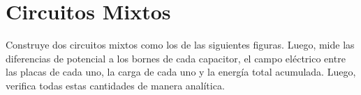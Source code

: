 \documentclass[12pt]{report}
\begin{document}
\section{Circuitos Mixtos}

Construye dos circuitos mixtos como los de las siguientes figuras. Luego, mide las diferencias de potencial a los bornes de cada capacitor, el campo eléctrico entre las placas de cada uno, la carga de cada uno y la energía total acumulada. Luego, verifica todas estas cantidades de manera analítica.
\end{document}
